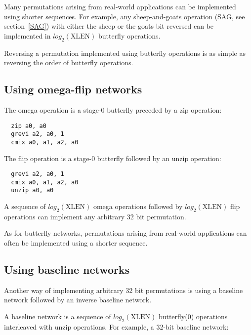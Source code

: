 Many permutations arising from real-world applications can be implemented
using shorter sequences. For example, any sheep-and-goats operation (SAG, see section~\ref{SAG})
with either the sheep or the goats bit reversed can be implemented in $log_2(\textrm{XLEN})$
butterfly operations.

Reversing a permutation implemented using butterfly operations is as simple as
reversing the order of butterfly operations.


\subsection{Using omega-flip networks}

The omega operation is a stage-0 butterfly preceded by a zip operation:

\begin{verbatim}
  zip a0, a0
  grevi a2, a0, 1
  cmix a0, a1, a2, a0
\end{verbatim}

The flip operation is a stage-0 butterfly followed by an unzip operation:

\begin{verbatim}
  grevi a2, a0, 1
  cmix a0, a1, a2, a0
  unzip a0, a0
\end{verbatim}

A sequence of $log_2(\textrm{XLEN})$ omega operations followed by
$log_2(\textrm{XLEN})$ flip operations can implement any arbitrary 32 bit
permutation.

As for butterfly networks, permutations arising from real-world applications
can often be implemented using a shorter sequence.


\subsection{Using baseline networks}

Another way of implementing arbitrary 32 bit permutations is using a
baseline network followed by an inverse baseline network.

A baseline network is a sequence of $log_2(\textrm{XLEN})$ butterfly(0)
operations interleaved with unzip operations. For example, a 32-bit
baseline network:

